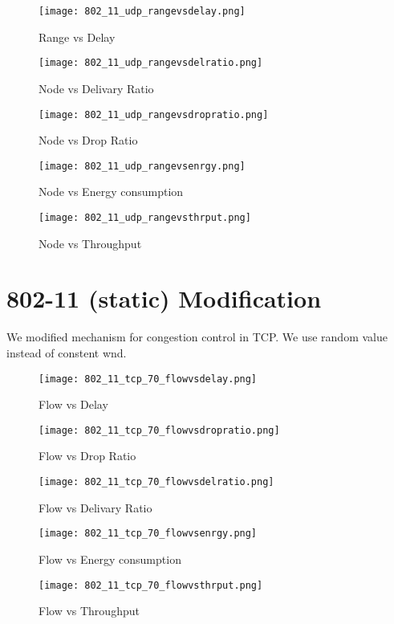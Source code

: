 \documentclass{report}
\begin{document}
\begin{figure}
  \caption{Range vs Delay}
  \centering
    \texttt{[image: 802\_11\_udp\_rangevsdelay.png]}
\end{figure}
\begin{figure}
  \caption{Node vs Delivary Ratio}
  \centering
    \texttt{[image: 802\_11\_udp\_rangevsdelratio.png]}
\end{figure}
\begin{figure}
  \caption{Node vs Drop Ratio}
  \centering
    \texttt{[image: 802\_11\_udp\_rangevsdropratio.png]}
\end{figure}
\begin{figure}
  \caption{Node vs Energy consumption}
  \centering
    \texttt{[image: 802\_11\_udp\_rangevsenrgy.png]}
\end{figure}
\begin{figure}
  \caption{Node vs Throughput}
  \centering
    \texttt{[image: 802\_11\_udp\_rangevsthrput.png]}
\end{figure}

\chapter{802-11 (static) Modification}
We modified mechanism for congestion control in TCP.
We use random value instead of constent wnd.
\begin{figure}
  \caption{Flow vs Delay}
  \centering
    \texttt{[image: 802\_11\_tcp\_70\_flowvsdelay.png]}
\end{figure}
\begin{figure}
  \caption{Flow vs Drop Ratio}
  \centering
    \texttt{[image: 802\_11\_tcp\_70\_flowvsdropratio.png]}
\end{figure}
\begin{figure}
  \caption{Flow vs Delivary Ratio}
  \centering
    \texttt{[image: 802\_11\_tcp\_70\_flowvsdelratio.png]}
\end{figure}
\begin{figure}
  \caption{Flow vs Energy consumption}
  \centering
    \texttt{[image: 802\_11\_tcp\_70\_flowvsenrgy.png]}
\end{figure}
\begin{figure}
  \caption{Flow vs Throughput}
  \centering
    \texttt{[image: 802\_11\_tcp\_70\_flowvsthrput.png]}
\end{figure}
\end{document}
